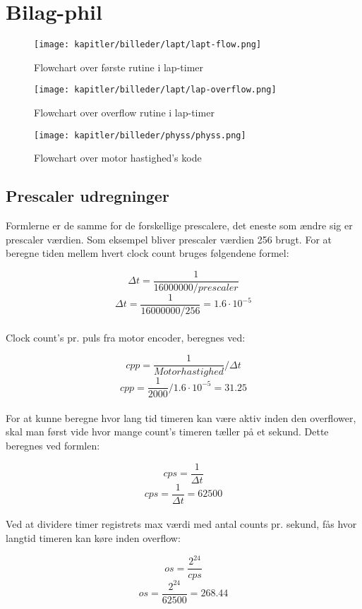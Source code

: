 \newpage

\section{Bilag-phil}

\begin{figure}
\centering
\texttt{[image: kapitler/billeder/lapt/lapt-flow.png]}
\caption{Flowchart over første rutine i lap-timer}
\label{fig:lapt-flow}
\end{figure}

\newpage

\begin{figure}
\centering
\texttt{[image: kapitler/billeder/lapt/lap-overflow.png]}
\caption{Flowchart over overflow rutine i lap-timer}
\label{fig:lap-overflow}
\end{figure}

\newpage

\begin{figure}
\centering
\texttt{[image: kapitler/billeder/physs/physs.png]}
\caption{Flowchart over motor hastighed's kode}
\label{fig:physs}
\end{figure}

\subsection{Prescaler udregninger}
\label{subsec:prescaler_udregninger}
Formlerne er de samme for de forskellige prescalere, det eneste som ændre sig er prescaler værdien. Som eksempel bliver prescaler værdien 256 brugt. For at beregne tiden mellem hvert clock count bruges følgendene formel:

$$\Delta t = \frac{1}{16000000/prescaler}$$
$$\Delta t = \frac{1}{16000000/256} = 1.6 \cdot 10^{-5}$$\\

Clock count's pr. puls fra motor encoder, beregnes ved:

$$cpp = \frac{1}{Motor hastighed} / \Delta t$$
$$cpp = \frac{1}{2000} / 1.6 \cdot 10^{-5} = 31.25$$\\

For at kunne beregne hvor lang tid timeren kan være aktiv inden den overflower, skal man først vide hvor mange count's timeren tæller på et sekund. Dette beregnes ved formlen:

$$cps = \frac{1}{\Delta t}$$
$$cps = \frac{1}{\Delta t} = 62500$$\\

Ved at dividere timer registrets max værdi med antal counts pr. sekund, fås hvor langtid timeren kan køre inden overflow:

$$os = \frac{2^{24}}{cps}$$
$$os = \frac{2^{24}}{62500} = 268.44$$
